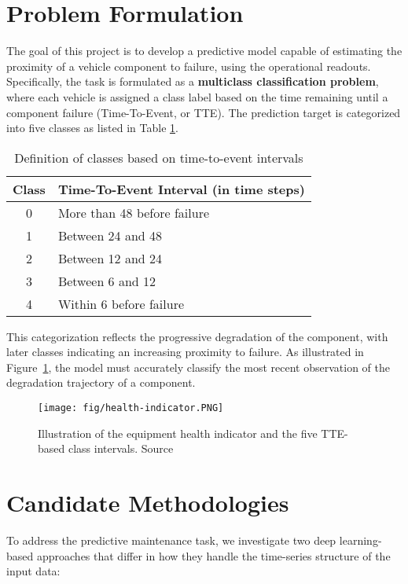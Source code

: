 \documentclass[a4paper,12pt]{article}
\begin{document}
\section{Problem Formulation}

The goal of this project is to develop a predictive model capable of estimating the proximity of a vehicle component to failure, using the operational readouts. Specifically, the task is formulated as a \textbf{multiclass classification problem}, where each vehicle is assigned a class label based on the time remaining until a component failure (Time-To-Event, or TTE). The prediction target is categorized into five classes as listed in Table \ref{tab:class_definition}.

\begin{table}[h!]
\centering
\begin{tabular}{|c|l|}
\hline
\textbf{Class} & \textbf{Time-To-Event Interval (in time steps)} \\
\hline
0 & More than 48 before failure \\
1 & Between 24 and 48 \\
2 & Between 12 and 24 \\
3 & Between 6 and 12 \\
4 & Within 6 before failure \\
\hline
\end{tabular}
\caption{Definition of classes based on time-to-event intervals}
\label{tab:class_definition}
\end{table}

\noindent
This categorization reflects the progressive degradation of the component, with later classes indicating an increasing proximity to failure. As illustrated in Figure~\ref{fig:health-indicator}, the model must accurately classify the most recent observation of the degradation trajectory of a component. 

\begin{figure}[h!]
\centering
\texttt{[image: fig/health-indicator.PNG]}
\caption{Illustration of the equipment health indicator and the five TTE-based class intervals. Source \cite{scania_dataset_paper}}
\label{fig:health-indicator}
\end{figure}

\section{Candidate Methodologies}

To address the predictive maintenance task, we investigate two deep learning-based approaches that differ in how they handle the time-series structure of the input data:
\end{document}

